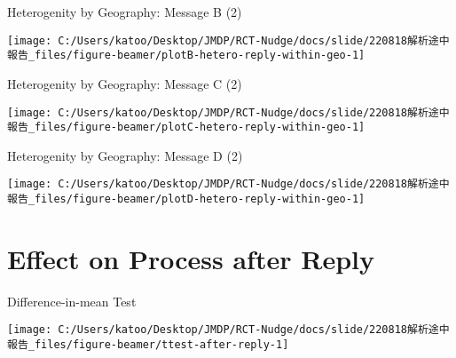 \documentclass[
      aspectratio=169,
        12pt,
    ]{beamer}
\begin{document}
\begin{frame}{Heterogenity by Geography: Message B (2)}
\protect\hypertarget{heterogenity-by-geography-message-b-2}{}
\begin{center}\texttt{[image: C:/Users/katoo/Desktop/JMDP/RCT-Nudge/docs/slide/220818解析途中報告\_files/figure-beamer/plotB-hetero-reply-within-geo-1]} \end{center}
\end{frame}

\begin{frame}{Heterogenity by Geography: Message C (2)}
\protect\hypertarget{heterogenity-by-geography-message-c-2}{}
\begin{center}\texttt{[image: C:/Users/katoo/Desktop/JMDP/RCT-Nudge/docs/slide/220818解析途中報告\_files/figure-beamer/plotC-hetero-reply-within-geo-1]} \end{center}
\end{frame}

\begin{frame}{Heterogenity by Geography: Message D (2)}
\protect\hypertarget{heterogenity-by-geography-message-d-2}{}
\begin{center}\texttt{[image: C:/Users/katoo/Desktop/JMDP/RCT-Nudge/docs/slide/220818解析途中報告\_files/figure-beamer/plotD-hetero-reply-within-geo-1]} \end{center}
\end{frame}

\hypertarget{effect-on-process-after-reply}{%
\section{Effect on Process after Reply}\label{effect-on-process-after-reply}}

\begin{frame}{Difference-in-mean Test}
\protect\hypertarget{difference-in-mean-test}{}
\begin{center}\texttt{[image: C:/Users/katoo/Desktop/JMDP/RCT-Nudge/docs/slide/220818解析途中報告\_files/figure-beamer/ttest-after-reply-1]} \end{center}
\end{frame}
\end{document}

